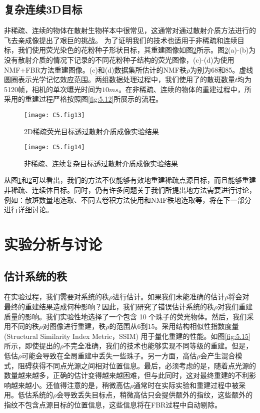\subsection{复杂连续3D目标}

非稀疏、连续的物体在散射生物样本中很常见，这通常对通过散射介质方法进行的飞去亲成像提出了艰巨的挑战。 为了证明我们的技术也适用于非稀疏和连续目标，我们使用荧光染色的花粉种子形状目标，其重建图像如图\ref{fig:5.14}所示。图\ref{fig:5.14}(a)-(b)为没有散射介质的情况下记录的不同花粉种子结构的荧光图像，(c)-(d)为使用 NMF+FBR方法重建图像。(c)和(d)数据集所估计的NMF秩$\rho$为别为68和85。虚线圆圈表示光学记忆效应范围。两组数据处理过程中，我们使用了的散斑数量$t$均为5120帧，相机的单次曝光时间为$10 ms$。在非稀疏、连续的物体的重建过程中，所采用的重建过程严格按照图\ref{fig:5.12}所展示的流程。
\begin{figure}[htp]
	\centering
	\texttt{[image: C5.fig13]}
	\caption{2D稀疏荧光目标透过散射介质成像实验结果}
	\label{fig:5.13}
\end{figure}
\begin{figure}[htp]
	\centering
	\texttt{[image: C5.fig14]}
	\caption{非稀疏、连续复杂目标透过散射介质成像实验结果}
	\label{fig:5.14}
\end{figure}

从图\ref{fig:5.13}和\ref{fig:5.14}可以看出，我们的方法不仅能够有效地重建稀疏点源目标，而且能够重建非稀疏、连续体目标。同时，仍有许多问题关于我们所提出地方法需要进行讨论，例如：散斑数量地选取、不同去卷积方法使用和NMF秩地选取等，将在下一部分进行详细讨论。

\section{实验分析与讨论}

\subsection{估计系统的秩}
在实验过程，我们需要对系统的秩$\rho$进行估计。如果我们未能准确的估计$\rho$将会对最终的重建结果造成何种影响？因此，我们研究了错误估计系统的秩$\rho$对我们重建质量的影响。我们实验性地选择了一个包含 10 个珠子的荧光物体。然后，我们采用不同的秩$\rho$对图像进行重建，秩$\rho$的范围从6到15。采用结构相似性指数度量 (Structural Similarity Index Metric，SSIM) \cite{Daoud2017} 用于量化重建的性能。如图\ref{fig:5.15} 所示，即使提出的$\rho$不完全准确，我们的技术也能够实现不同等级的重建。但是，低估$\rho$可能会导致在全局重建中丢失一些珠子。另一方面，高估$\rho$会产生混合模式，阻碍获得不同点光源之间相对位置信息。最后，必须考虑的是，随着点光源的数量越来越多，正确的估计变得越来越困难，但与此同时，这对最终重建的不利影响越来越小。还值得注意的是，稍微高估$\rho$通常时在实际实验和重建过程中被采用。低估系统的$\rho$会导致丢失目标点，稍微高估只会提供额外的指纹，这些额外的指纹不包含点源目标的位置信息，这些信息将在FBR过程中自动剔除。

